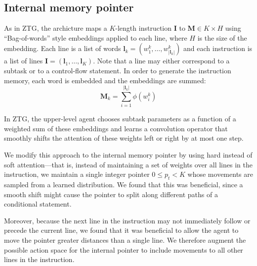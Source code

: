 \documentclass{article}
\begin{document}
\subsection{Internal memory pointer}
\label{internal-memory-pointer}
As in ZTG, the archicture maps a $K$-length instruction
$\mathbf{I}$ to
$\mathbf{M} \in K\times H$ using ``Bag-of-words'' style
embeddings applied to each line, where $H$ is the size of the embedding.  Each line is
a list of words $\mathbf{l}_k = \left(w^k_1,\dots,w^k_{|\mathbf{l}_k|}\right)$ and each instruction is
a list of lines $\mathbf{I} = \left(\mathbf{l}_1,\dots,\mathbf{l}_{K}\right)$. Note that a
line may either correspond to a subtask or to a control-flow statement.
In order to generate the instruction memory, each word is embedded and the
embeddings are summed:
\begin{equation}
  \mathbf{M}_k = \sum_{i=1}^{|\mathbf{l}_k|} \phi\left(w^k_i\right)
\end{equation}

In ZTG, the
upper-level agent chooses 
subtask parameters as a function of a weighted sum of these
embeddings and learns a convolution operator 
that smoothly shifts the attention of these weights left or right by at most one step.

We modify this approach to the internal memory pointer by using hard instead of
soft attention---that is, instead of maintaining a set of weights over all
lines in the instruction, we maintain a single integer pointer $0 \le p_t < K$ 
whose movements are sampled from a learned distribution. We found that this was beneficial, since a smooth shift might
cause the pointer to split along different paths of a conditional statement.

Moreover, because the next line in the instruction may not immediately follow or
precede the current line, we found that it was beneficial to allow the agent to
move the pointer greater distances than a single line. We therefore augment the
possible action space for the internal pointer to include movements to all other
lines in the instruction.
\end{document}
